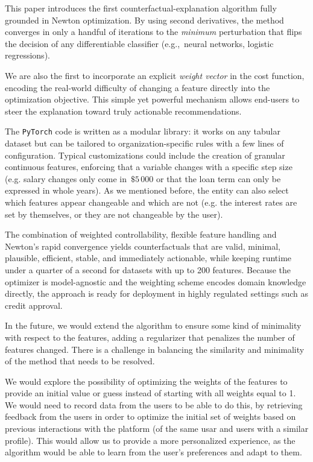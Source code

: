 \documentclass[12pt]{extarticle}
\numberwithin{equation}{section}
\begin{document}
This paper introduces the first counterfactual-explanation algorithm fully grounded in Newton optimization.  
By using second derivatives, the method converges in only a handful of iterations to the \emph{minimum} perturbation that flips the decision of any differentiable classifier (e.g.,\ neural networks, logistic regressions).  

We are also the first to incorporate an explicit \emph{weight vector} in the cost function, encoding the real-world difficulty of changing a feature directly into the optimization objective. This simple yet powerful mechanism allows end-users to steer the explanation toward truly actionable recommendations.

The \texttt{PyTorch} code is written as a modular library: it works on any tabular dataset but can be tailored to organization-specific rules with a few lines of configuration. Typical customizations could include the creation of granular continuous features, enforcing that a variable changes with a specific step size (e.g. salary changes only come in \(\,\$5\,000\) or that the loan term can only be expressed in whole years). As we mentioned before, the entity can also select which features appear changeable and which are not (e.g. the interest rates are set by themselves, or they are not changeable by the user).

The combination of weighted controllability, flexible feature handling and Newton's rapid convergence yields counterfactuals that are valid, minimal, plausible, efficient, stable, and immediately actionable, while keeping runtime under a quarter of a second for datasets with up to 200 features. Because the optimizer is model-agnostic and the weighting scheme encodes domain knowledge directly, the approach is ready for deployment in highly regulated settings such as credit approval.

In the future, we would extend the algorithm to ensure some kind of minimality with respect to the features, adding a regularizer that penalizes the number of features changed. There is a challenge in balancing the similarity and minimality of the method that needs to be resolved. 

We would explore the possibility of optimizing the weights of the features to provide an initial value or guess instead of starting with all weights equal to 1. We would need to record data from the users to be able to do this, by retrieving feedback from the users in order to optimize the initial set of weights based on previous interactions with the platform (of the same usar and users with a similar profile). This would allow us to provide a more personalized experience, as the algorithm would be able to learn from the user's preferences and adapt to them.
\end{document}
